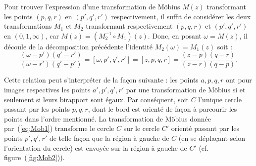 Pour trouver l'expression d'une transformation de Möbius $M(z)$ transformant les points $(p,q,r)$ en $(p',q',r')$ respectivement, il suffit de considérer les deux transformations $M_1$ et $M_2$ transformant respectivement $(p,q,r)$ et $(p',q',r')$ en $(0,1,\infty)$, car $M(z)=(M_2^{-1} \circ M_1)(z)$. Donc, en posant $\omega =M(z)$, il découle de la décomposition précédente l'identité $M_2(\omega)=M_1(z)$ soit :
\begin{equation}\label{eq:Mob1}\frac{(\omega-p')(q'-r')}{(\omega-r')(q'-p')} = [\omega,p',q',r']=[z,p,q,r]=\frac{(z-p)(q-r)}{(z-r)(q-p)}.
\end{equation}

Cette relation peut s'interpréter de la façon suivante : les points $a,p,q,r$ ont pour images respectives les points $a',p',q',r'$ par une transformation de Möbius si et seulement si leurs birapport sont égaux. Par conséquent, soit $C$ l'unique cercle passant par les points $p,q,r$, dont le bord est orienté de façon à parcourir les points dans l'ordre mentionné. La transformation de Möbius donnée par~(\ref{eq:Mob1}) transforme le cercle $C$ sur le cercle $C'$ orienté passant par les points $p',q',r'$ de telle façon que la région à gauche de $C$ (en se déplaçant selon l'orientation du cercle) est envoyée sur la région à gauche de $C'$ (cf. figure~(\ref{fig:Mob2})).


